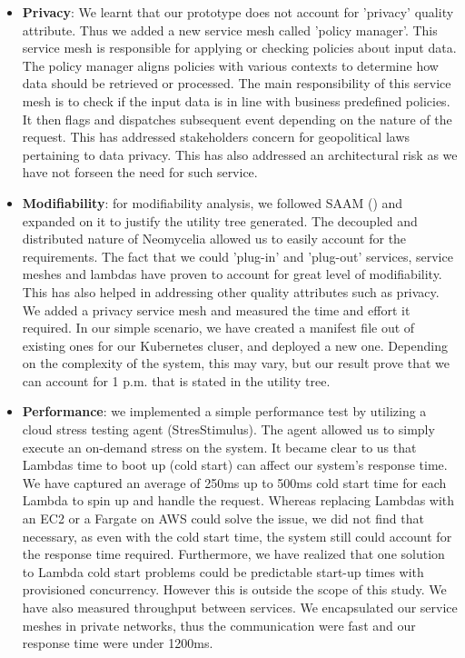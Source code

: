 \documentclass[10pt, conference]{IEEEtran}
\begin{document}
\begin{itemize}
    \item \textbf{Privacy}: We learnt that our prototype does not account for 'privacy' quality attribute. Thus we added a new service mesh called 'policy manager'. This service mesh is responsible for applying or checking policies about input data. The policy manager aligns policies with various contexts to determine how data should be retrieved or processed. The main responsibility of this service mesh is to check if the input data is in line with business predefined policies. It then flags and dispatches subsequent event depending on the nature of the request. This has addressed stakeholders concern for geopolitical laws pertaining to data privacy. This has also addressed an architectural risk as we have not forseen the need for such service.
    \item \textbf{Modifiability}: for modifiability analysis, we followed SAAM (\cite{kazman1994saam}) and expanded on it to justify the utility tree generated. The decoupled and distributed nature of Neomycelia allowed us to easily account for the requirements. The fact that we could 'plug-in' and 'plug-out' services, service meshes and lambdas have proven to account for great level of modifiability. This has also helped in addressing other quality attributes such as privacy. We added a privacy service mesh and measured the time and effort it required. In our simple scenario, we have created a manifest file out of existing ones for our Kubernetes cluser, and deployed a new one. Depending on the complexity of the system, this may vary, but our result prove that we can account for 1 p.m. that is stated in the utility tree.
    \item \textbf{Performance}: we implemented a simple performance test by utilizing a cloud stress testing agent (StresStimulus). The agent allowed us to simply execute an on-demand stress on the system. It became clear to us that Lambdas time to boot up (cold start) can affect our system's response time. We have captured an average of 250ms up to 500ms cold start time for each Lambda to spin up and handle the request. Whereas replacing Lambdas with an EC2 or a Fargate on AWS could solve the issue, we did not find that necessary, as even with the cold start time, the system still could account for the response time required. Furthermore, we have realized that one solution to Lambda cold start problems could be predictable start-up times with provisioned concurrency. However this is outside the scope of this study. We have also measured throughput between services. We encapsulated our service meshes in private networks, thus the communication were fast and our response time were under 1200ms.
\end{itemize}
\end{document}
